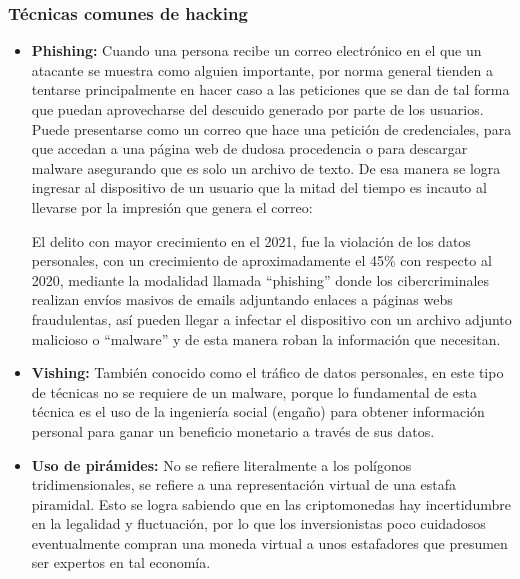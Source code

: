 \subsubsection{Técnicas comunes de hacking}


\begin{itemize}
  \item \textbf{Phishing:}
    Cuando una persona recibe un correo electrónico en el que un atacante se
    muestra como alguien importante, por norma general tienden a tentarse
    principalmente en hacer caso a las peticiones que se dan de tal forma que
    puedan aprovecharse del descuido generado por parte de los usuarios. Puede
    presentarse como un correo que hace una petición de credenciales, para que
    accedan a una página web de dudosa procedencia o para descargar malware
    asegurando que es solo un archivo de texto. De esa manera se logra ingresar al
    dispositivo de un usuario que la mitad del tiempo es incauto al llevarse por la
    impresión que genera el correo:

    \begin{displayquote}
      El delito con mayor crecimiento en el 2021, fue la violación de los datos
      personales, con un crecimiento de aproximadamente el 45\% con respecto al 2020,
      mediante la modalidad llamada ``phishing'' donde los cibercriminales realizan
      envíos masivos de emails adjuntando enlaces a páginas webs fraudulentas, así
      pueden llegar a infectar el dispositivo con un archivo adjunto malicioso o
      ``malware'' y de esta manera roban la información que necesitan.
      \parencite[INCIBE, 2010, como se cita en][]{Bueno2022}
    \end{displayquote}

  \item \textbf{Vishing:}
    También conocido como el tráfico de datos personales, en este tipo de
    técnicas no se requiere de un malware, porque lo fundamental de esta
    técnica es el uso de la ingeniería social (engaño) para obtener información
    personal para ganar un beneficio monetario a través de sus datos.
    \parencite{Mosquera2019}

  \item \textbf{Uso de pirámides:}
    No se refiere literalmente a los polígonos tridimensionales, se refiere a
    una representación virtual de una estafa piramidal. Esto se logra sabiendo
    que en las criptomonedas hay incertidumbre en la legalidad y fluctuación,
    por lo que los inversionistas poco cuidadosos eventualmente compran una
    moneda virtual a unos estafadores que presumen ser expertos en tal economía.
    \parencite{Mosquera2019}


\end{itemize}

